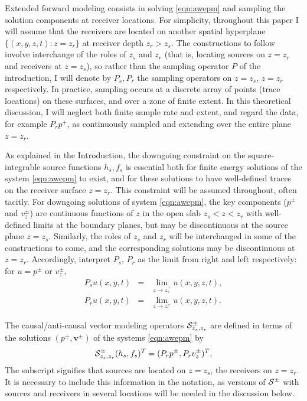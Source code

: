 \documentclass[georeport,12pt]{geophysics}
\newcommand{\bv}{\mathbf{v}}
\begin{document}
Extended forward modeling consists in solving \ref{eqn:awepm} and
sampling the solution components at receiver locations. For
simplicity, throughout this paper I will assume that the receivers are
located on another spatial hyperplane $\{(x,y,z,t): z=z_r\}$ at
receiver depth $z_r>z_s$. The constructions to follow involve interchange
of the roles of $z_s$ and $z_r$ (that is, locating sources on $z=z_r$
and receivers at $z=z_s$), so rather than the sampling operator $P$ of
the introduction, I will denote by $P_s,P_r$ the sampling 
operators on $z=z_s$, $z=z_r$ respectively. In practice, sampling
occurs at a discrete array of points (trace locations) on these
surfaces, and over a zone of finite extent. In this theoretical
discussion, I will neglect both finite sample rate and extent, and
regard the data, for example $P_rp^+$, as continuously sampled and
extending over the entire plane $z=z_r$.

As explained in the Introduction, the downgoing constraint on the square-integrable
source functions $h_s, f_s$ is
essential both for finite energy solutions of the system
\ref{eqn:awepm} to exist, and for these solutions to have well-defined
traces on the receiver surface $z=z_r$. This constraint will be
assumed throughout, often tacitly.
For downgoing solutions of system \ref{eqn:awepm}, the key
components ($p^{\pm}$ and $v^{\pm}_z$) are continuous functions of $z$
in the open slab $z_s<z<z_r$ with well-defined limits at the boundary
planes, but may be discontinuous at the source plane
$z=z_s$. Similarly, the roles of $z_s$ and $z_r$ will be interchanged
in some of the constructions to come, and the corresponding solutions
may be discontinuous at $z=z_r$. Accordingly, interpret $P_s$, $P_r$
as the limit from right and left respectively: for $u=p^{\pm}$ or
$v^{\pm}_z$,
\begin{eqnarray}
  \label{eqn:defsamp}
  P_su(x,y,t) &=& \lim_{z \rightarrow z_s^+} u(x,y,z,t),\nonumber \\
  P_ru(x,y,t) &=& \lim_{z \rightarrow z_r^-} u(x,y,z,t).                  
\end{eqnarray}


The causal/anti-causal vector
modeling operators ${\cal S}^{\pm}_{z_s,z_r}$ are defined in terms of
the solutions $(p^{\pm},\bv^{\pm})$ of the systems \ref{eqn:awepm} by
\begin{equation}
  {\cal S}^{\pm}_{z_s,z_r}(h_s,f_s)^T  = (P_rp^{\pm},P_r v_z^{\pm})^T,
  \label{eqn:fwd}
\end{equation}
The subscript signifies that sources are located on $z=z_s$, the
receivers on $z=z_r$. It is necessary to include this information in
the notation, as versions of ${\cal S}^{\pm}$ with sources and receivers in
several locations will be needed in the discussion below.
\end{document}
